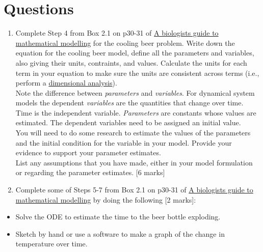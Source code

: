 \documentclass[]{book}
\begin{document}
\section*{Questions}\label{questions}

\begin{enumerate}
\def\labelenumi{\arabic{enumi}.}
\setcounter{enumi}{4}
\item
  Complete Step 4 from Box 2.1 on p30-31 of
  \href{https://ebookcentral-proquest-com.qe2a-proxy.mun.ca/lib/MUN/detail.action?docID=768551}{A
  biologists guide to mathematical modelling} for the cooling beer
  problem. Write down the equation for the cooling beer model, define
  all the parameters and variables, also giving their units, contraints,
  and values. Calculate the units for each term in your equation to make
  sure the units are consistent across terms (i.e., perform a
  \href{https://en.wikipedia.org/wiki/Dimensional_analysis}{dimensional
  analysis}).\\[2\baselineskip]Note the difference between
  \emph{parameters} and \emph{variables}. For dynamical system models
  the dependent \emph{variables} are the quantities that change over
  time. Time is the independent variable. \emph{Parameters} are
  constants whose values are estimated. The dependent variables need to
  be assigned an initial value.\\[2\baselineskip]You will need to do
  some research to estimate the values of the parameters and the initial
  condition for the variable in your model. Provide your evidence to
  support your parameter estimates.\\
  List any assumptions that you have made, either in your model
  formulation or regarding the parameter estimates. {[}6 marks{]}
\item
  Complete some of Steps 5-7 from Box 2.1 on p30-31 of
  \href{https://ebookcentral-proquest-com.qe2a-proxy.mun.ca/lib/MUN/detail.action?docID=768551}{A
  biologists guide to mathematical modelling} by doing the following
  {[}2 marks{]}:
\end{enumerate}

\begin{itemize}
\item
  Solve the ODE to estimate the time to the beer bottle exploding.
\item
  Sketch by hand or use a software to make a graph of the change in
  temperature over time.
\end{itemize}
\end{document}
